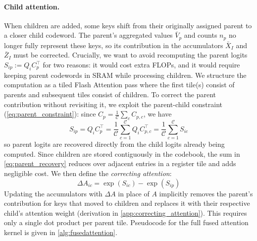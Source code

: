\paragraph{Child attention.}
\label{sec:child_attention}
When children are added, some keys shift from their originally assigned parent to a closer child codeword. The parent's aggregated values $\bar{V}_p$ and counts $n_p$ no longer fully represent these keys, so its contribution in the accumulators $\bar{X}_I$ and $\bar{Z}_I$ must be corrected. Crucially, we want to avoid recomputing the parent logits $S_{ip} := Q_i C_p^\top$ for two reasons: it would cost extra FLOPs, and it would require keeping parent codewords in SRAM while processing children. We structure the computation as a tiled Flash Attention pass where the first tile(s) consist of parents and subsequent tiles consist of children. To correct the parent contribution without revisiting it, we exploit the parent-child constraint (\cref{eq:parent_constraint}): since $C_p = \frac{1}{\mathcal{C}}\sum_c C_{p,c}$, we have
\begin{equation}
\label{eq:parent_recovery}
S_{ip} = Q_i C_p^\top = \frac{1}{\mathcal{C}}\sum_{c=1}^{\mathcal{C}} Q_i C_{p,c}^\top = \frac{1}{\mathcal{C}}\sum_{c=1}^{\mathcal{C}} S_{ic}
\end{equation}
so parent logits are recovered directly from the child logits already being computed. Since children are stored contiguously in the codebook, the sum in \cref{eq:parent_recovery} reduces over adjacent entries in a register tile and adds negligible cost. We then define the \emph{correcting attention}:
\begin{equation}
\label{eq:correcting_attention}
\Delta A_{ic} = \exp(S_{ic}) - \exp(S_{ip})
\end{equation}
Updating the accumulators with $\Delta A$ in place of $A$ implicitly removes the parent's contribution for keys that moved to children and replaces it with their respective child's attention weight (derivation in \cref{app:correcting_attention}). This requires only a single dot product per parent tile. Pseudocode for the full fused attention kernel is given in \cref{alg:fusedattention}.
\renewcommand{\algorithmicrequire}{\textbf{Input:}}
\renewcommand{\algorithmicensure}{\textbf{Output:}}
